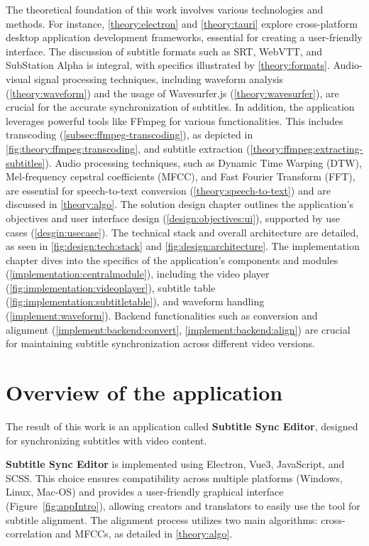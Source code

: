The theoretical foundation of this work involves various technologies and methods. For instance, \ref{theory:electron} and \ref{theory:tauri} explore cross-platform desktop application development frameworks, essential for creating a user-friendly interface. The discussion of subtitle formats such as SRT, WebVTT, and SubStation Alpha is integral, with specifics illustrated by \ref{theory:formats}. Audio-visual signal processing techniques, including waveform analysis (\ref{theory:waveform}) and the usage of Wavesurfer.js (\ref{theory:wavesurfer}), are crucial for the accurate synchronization of subtitles. In addition, the application leverages powerful tools like FFmpeg for various functionalities. This includes transcoding (\ref{subsec:ffmpeg-transcoding}), as depicted in \ref{fig:theory:ffmpeg:transcoding}, and subtitle extraction (\ref{theory:ffmpeg:extracting-subtitles}). Audio processing techniques, such as Dynamic Time Warping (DTW), Mel-frequency cepstral coefficients (MFCC), and Fast Fourier Transform (FFT), are essential for speech-to-text conversion (\ref{theory:speech-to-text}) and are discussed in \ref{theory:algo}. The solution design chapter outlines the application's objectives and user interface design (\ref{design:objectives:ui}), supported by use cases (\ref{desgin:usecase}). The technical stack and overall architecture are detailed, as seen in \ref{fig:design:tech:stack} and \ref{fig:design:architecture}. The implementation chapter dives into the specifics of the application's components and modules (\ref{implementation:centralmodule}), including the video player (\ref{fig:implementation:videoplayer}), subtitle table (\ref{fig:implementation:subtitletable}), and waveform handling (\ref{implement:waveform}). Backend functionalities such as conversion and alignment (\ref{implement:backend:convert}, \ref{implement:backend:align}) are crucial for maintaining subtitle synchronization across different video versions.

\section{Overview of the application}

The result of this work is an application called \textbf{Subtitle Sync Editor}, designed for synchronizing subtitles with video content.

\textbf{Subtitle Sync Editor} is implemented using Electron, Vue3, JavaScript, and SCSS. This choice ensures compatibility across multiple platforms (Windows, Linux, Mac-OS) and provides a user-friendly graphical interface (Figure~\ref{fig:appIntro}), allowing creators and translators to easily use the tool for subtitle alignment. The alignment process utilizes two main algorithms: cross-correlation and MFCCs, as detailed in \ref{theory:algo}.

